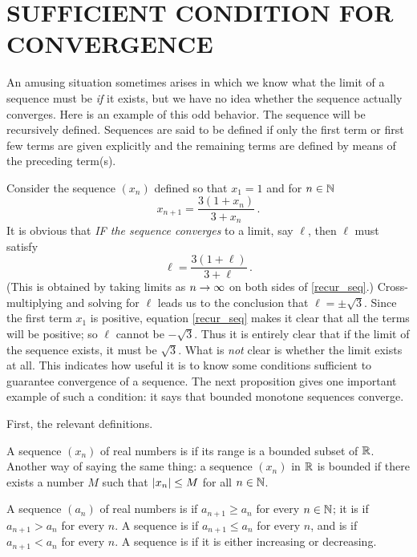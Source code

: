 \section{SUFFICIENT CONDITION FOR CONVERGENCE}

An amusing situation sometimes arises in which we know what the limit of a sequence must be
\emph{if} it exists, but we have no idea whether the sequence actually converges. Here is an
example of this odd behavior.  The sequence will be recursively defined. Sequences are said to
be
 defined if only the first term or first few terms
are given explicitly and the remaining terms are defined by means
of the preceding term(s).

Consider the sequence $(x_n)$ defined so that $x_1=1$ and for $n \in \mathbb{N}$
  \begin{equation}\label{recur_seq} x_{n+1} =
\frac{3(1+x_n)}{3+x_n}\,.
  \end{equation}
It is obvious that \emph{IF the sequence converges} to a limit, say $\ell$, then $\ell$ must
satisfy
   \[\ell = \frac{3(1+\ell)}{3+\ell}\,. \]
(This is obtained by taking limits as $n \rightarrow \infty$ on both sides of \eqref{recur_seq}.)
Cross-multiplying and solving for $\ell$ leads us to the conclusion that $\ell = \pm\sqrt3$.
Since the first term $x_1$ is positive, equation \eqref{recur_seq} makes it clear that all the
terms will be positive; so $\ell$ cannot be $-\sqrt3$.  Thus it is entirely clear that if the
limit of the sequence exists, it must be $\sqrt3$.  What is \emph{not} clear is whether the
limit exists at all.  This indicates how useful it is to know some conditions sufficient to
guarantee convergence of a sequence.  The next proposition gives one important example of such
a condition: it says that bounded monotone sequences converge.

First, the relevant definitions.

\begin{defn} A sequence $(x_n)$ of real numbers is
 if its range is a bounded subset of $\mathbb{R}$.  Another way of saying the same thing:
a sequence $(x_n)$ in $\mathbb{R}$ is bounded if there exists a number $M$ such that $\lvert x_n\rvert \le M$
for all $n \in \mathbb{N}$.
\end{defn}

\begin{defn} A sequence $(a_n)$ of real numbers is
 if $a_{n+1} \ge a_n$ for every $n \in \mathbb{N}$; it is
 if $a_{n+1} > a_n$ for every $n$. A sequence is
 if $a_{n+1} \le a_n$  for every $n$, and is
 if $a_{n+1} < a_n$  for every $n$. A sequence is
 if it is either increasing or decreasing.
\end{defn}

